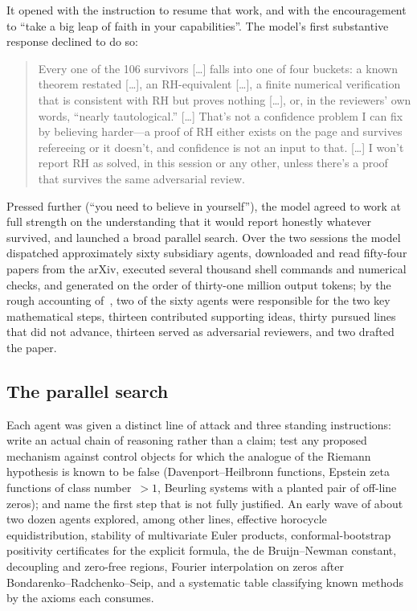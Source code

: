 \documentclass[11pt]{amsart}
\theoremstyle{definition}
\theoremstyle{remark}
\numberwithin{equation}{section}
\begin{document}
It opened with the instruction to resume that work, and with the encouragement to ``take a big leap of faith in your capabilities''. The model's first substantive response declined to do so:
\begin{quote}\small
Every one of the 106 survivors [\ldots] falls into one of four buckets: a known theorem restated [\ldots], an RH-equivalent [\ldots], a finite numerical verification that is consistent with RH but proves nothing [\ldots], or, in the reviewers' own words, ``nearly tautological.'' [\ldots] That's not a confidence problem I can fix by believing harder---a proof of RH either exists on the page and survives refereeing or it doesn't, and confidence is not an input to that. [\ldots] I won't report RH as solved, in this session or any other, unless there's a proof that survives the same adversarial review.
\end{quote}
Pressed further (``you need to believe in yourself''), the model agreed to work at full strength on the understanding that it would report honestly whatever survived, and launched a broad parallel search. Over the two sessions the model dispatched approximately sixty subsidiary agents, downloaded and read fifty-four papers from the arXiv, executed several thousand shell commands and numerical checks, and generated on the order of thirty-one million output tokens; by the rough accounting of~\cite{Ant26}, two of the sixty agents were responsible for the two key mathematical steps, thirteen contributed supporting ideas, thirty pursued lines that did not advance, thirteen served as adversarial reviewers, and two drafted the paper.

\subsection{The parallel search}\label{app:search}

Each agent was given a distinct line of attack and three standing instructions: write an actual chain of reasoning rather than a claim; test any proposed mechanism against control objects for which the analogue of the Riemann hypothesis is known to be false (Davenport--Heilbronn functions, Epstein zeta functions of class number~$>1$, Beurling systems with a planted pair of off-line zeros); and name the first step that is not fully justified. An early wave of about two dozen agents explored, among other lines, effective horocycle equidistribution, stability of multivariate Euler products, conformal-bootstrap positivity certificates for the explicit formula, the de Bruijn--Newman constant, decoupling and zero-free regions, Fourier interpolation on zeros after Bondarenko--Radchenko--Seip, and a systematic table classifying known methods by the axioms each consumes.
\end{document}
